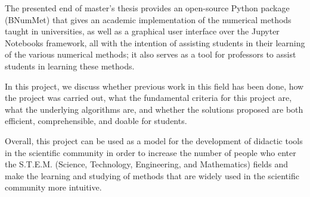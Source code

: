 \newcommand{\KeywordsAbstract}{Numerical methods, Open-source, Python, Jupyter, Software development, Linear systems, Interpolation, Nonlinear, Least squares, Random number generators}

The presented end of master's thesis provides an open-source Python package (BNumMet) that gives an academic implementation of the numerical methods taught in universities, as well as a graphical user interface over the Jupyter Notebooks framework, all with the intention of assisting students in their learning of the various numerical methods; it also serves as a tool for professors to assist students in learning these methods.


In this project, we discuss whether previous work in this field has been done, how the project was carried out, what the fundamental criteria for this project are, what the underlying algorithms are, and whether the solutions proposed are both efficient, comprehensible, and doable for students.

Overall, this project can be used as a model for the development of didactic tools in the scientific community in order to increase the number of people who enter the S.T.E.M. (Science, Technology, Engineering, and Mathematics) fields and make the learning and studying of methods that are widely used in the scientific community more intuitive. 